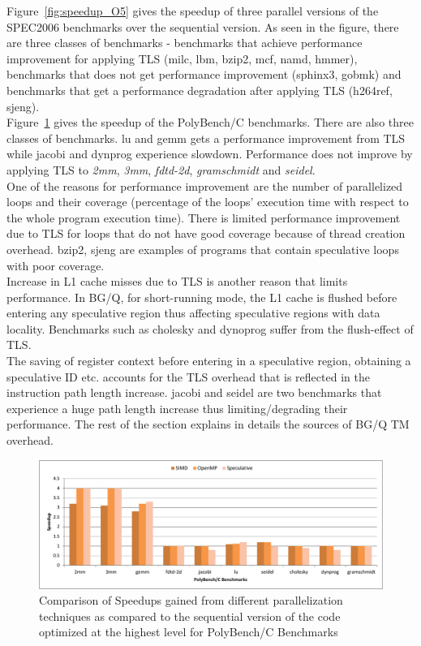\documentclass[10pt]{report}          %
\begin{document}
Figure~\ref{fig:speedup_O5} gives the speedup of three parallel versions of the SPEC2006 benchmarks over the sequential version.  As seen in the figure, there are three classes of benchmarks - benchmarks that achieve performance improvement for applying TLS (milc, lbm, bzip2, mcf, namd, hmmer), benchmarks that does not get performance improvement (sphinx3, gobmk) and benchmarks that get a performance degradation after applying TLS (h264ref, sjeng).  \\
Figure~\ref{fig:poly_O5} gives the speedup of the PolyBench/C benchmarks. There are also three classes of benchmarks. lu and gemm gets a performance improvement from TLS while jacobi and dynprog experience slowdown.  Performance does not improve by applying TLS to \textit{2mm}, \textit{3mm}, \textit{fdtd-2d}, \textit{gramschmidt} and \textit{seidel}.\\
One of the reasons for performance improvement are the number of parallelized loops and their coverage (percentage of the loops' execution time with respect to the whole program execution time).  There is limited performance improvement due to TLS for loops that do not have good coverage because of thread creation overhead. bzip2, sjeng are examples of programs that contain speculative loops with poor coverage. \\
Increase in L1 cache misses due to TLS is another reason that limits performance.  In BG/Q, for short-running mode, the L1 cache is flushed before entering any speculative region thus affecting speculative regions with data locality.  Benchmarks such as cholesky and dynoprog suffer from the flush-effect of TLS.\\
The saving of register context before entering in a speculative region, obtaining a speculative ID etc. accounts for the TLS overhead that is reflected in the instruction path length increase.  jacobi and seidel are two benchmarks that experience a huge path length increase thus limiting/degrading their performance.
The rest of the section explains in details the sources
of BG/Q TM overhead.

\begin{figure}[h]
\centering
\includegraphics[scale=0.56]{./pdf/poly_O5.pdf}
\caption{Comparison of Speedups gained from different parallelization techniques as compared to the sequential version of the code optimized at the highest level for PolyBench/C Benchmarks}
\label{fig:poly_O5}
\end{figure}
\end{document}
